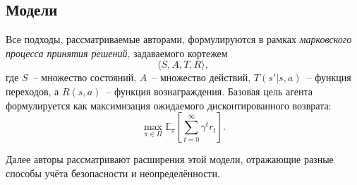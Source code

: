 \subsection{Модели}

Все подходы, рассматриваемые авторами, формулируются в рамках \emph{марковского процесса принятия решений}, задаваемого кортежем
\begin{equation}
\langle S, A, T, R \rangle,
\end{equation}
где $S$~-- множество состояний, $A$~-- множество действий, $T(s'|s,a)$~-- функция переходов, а $R(s,a)$~-- функция вознаграждения.  
Базовая цель агента формулируется как максимизация ожидаемого дисконтированного возврата:
\begin{equation}
\max_{\pi \in \Pi} \mathbb{E}_{\pi}\left[\sum_{t=0}^{\infty} \gamma^t r_t \right].
\end{equation}

Далее авторы рассматривают расширения этой модели, отражающие разные способы учёта безопасности и неопределённости.

